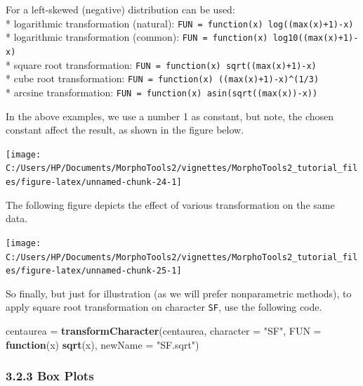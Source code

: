 \documentclass[
]{article}
\newenvironment{Shaded}{\begin{snugshade}}{\end{snugshade}}
\newcommand{\ControlFlowTok}[1]{\textcolor[rgb]{0.13,0.29,0.53}{\textbf{#1}}}
\newcommand{\DataTypeTok}[1]{\textcolor[rgb]{0.13,0.29,0.53}{#1}}
\newcommand{\KeywordTok}[1]{\textcolor[rgb]{0.13,0.29,0.53}{\textbf{#1}}}
\newcommand{\NormalTok}[1]{#1}
\newcommand{\StringTok}[1]{\textcolor[rgb]{0.31,0.60,0.02}{#1}}
\begin{document}
For a left-skewed (negative) distribution can be used:\\
* logarithmic transformation (natural):
\texttt{FUN\ =\ function(x)\ log((max(x)+1)-x)}\\
* logarithmic transformation (common):
\texttt{FUN\ =\ function(x)\ log10((max(x)+1)-x)}\\
* square root transformation:
\texttt{FUN\ =\ function(x)\ sqrt((max(x)+1)-x)}\\
* cube root transformation:
\texttt{FUN\ =\ function(x)\ ((max(x)+1)-x)\^{}(1/3)}\\
* arcsine transformation:
\texttt{FUN\ =\ function(x)\ asin(sqrt((max(x))-x))}

In the above examples, we use a number 1 as constant, but note, the
chosen constant affect the result, as shown in the figure below.

\begin{center}\texttt{[image: C:/Users/HP/Documents/MorphoTools2/vignettes/MorphoTools2\_tutorial\_files/figure-latex/unnamed-chunk-24-1]} \end{center}

The following figure depicts the effect of various transformation on the
same data.

\begin{center}\texttt{[image: C:/Users/HP/Documents/MorphoTools2/vignettes/MorphoTools2\_tutorial\_files/figure-latex/unnamed-chunk-25-1]} \end{center}

So finally, but just for illustration (as we will prefer nonparametric
methods), to apply square root transformation on character \texttt{SF},
use the following code.

\begin{Shaded}
\begin{Highlighting}[]
\NormalTok{centaurea =}\StringTok{ }\KeywordTok{transformCharacter}\NormalTok{(centaurea, }\DataTypeTok{character =} \StringTok{"SF"}\NormalTok{, }\DataTypeTok{FUN =} \ControlFlowTok{function}\NormalTok{(x) }\KeywordTok{sqrt}\NormalTok{(x), }
                               \DataTypeTok{newName =} \StringTok{"SF.sqrt"}\NormalTok{)}
\end{Highlighting}
\end{Shaded}

\hypertarget{box-plots}{%
\subsubsection{3.2.3 Box Plots}\label{box-plots}}
\end{document}
